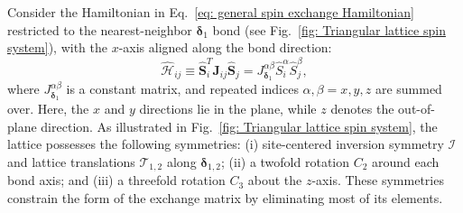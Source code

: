 \documentclass[aps, prx, nofootinbib, preprintnumbers, superscriptaddress]{revtex4-2}
\begin{document}
Consider the Hamiltonian in Eq.~\eqref{eq: general spin exchange Hamiltonian} restricted to the nearest-neighbor $\boldsymbol{\delta}_{1}$ bond (see Fig.~\ref{fig: Triangular lattice spin system}), with the $x$-axis aligned along the bond direction:
\begin{equation}
    \hat{\mathcal{H}}_{ij} 
    \equiv \hat{\mathbf{S}}_{i}^{T} \mathbf{J}_{ij} \hat{\mathbf{S}}_{j} 
    = J_{\boldsymbol\delta_{1}}^{\alpha\beta} \hat{S}_{i}^{\alpha} \hat{S}_{j}^{\beta},
\end{equation}
where $J_{\boldsymbol\delta_{1}}^{\alpha\beta}$ is a constant matrix, and repeated indices $\alpha, \beta = x, y, z$ are summed over. Here, the $x$ and $y$ directions lie in the plane, while $z$ denotes the out-of-plane direction.
As illustrated in Fig.~\ref{fig: Triangular lattice spin system}, the lattice possesses the following symmetries: (i) site-centered inversion symmetry $\mathcal{I}$ and lattice translations $\mathcal{T}_{1,2}$ along $\boldsymbol{\delta}_{1,2}$; (ii) a twofold rotation $C_{2}$ around each bond axis; and (iii) a threefold rotation $C_{3}$ about the $z$-axis. These symmetries constrain the form of the exchange matrix by eliminating most of its elements.
\end{document}
